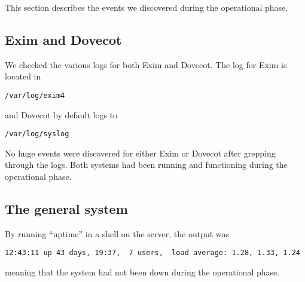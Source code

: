 This section describes the events we discovered during the operational
phase.
\subsection{Exim and Dovecot}
We checked the various logs for both Exim and Dovecot. The log for Exim
is located in \begin{verbatim}/var/log/exim4\end{verbatim} and Dovecot
by default logs to \begin{verbatim}/var/log/syslog\end{verbatim}

No huge events were discovered for either Exim or Dovecot after
grepping through the logs. Both systems had been running and functioning
during the operational phase.
\subsection{The general system}
By running ``uptime'' in a shell on the server, the output was
\begin{verbatim}12:43:11 up 43 days, 19:37,  7 users,  load average: 1.28, 1.33, 1.24\end{verbatim}
meaning that the system had not been down during the operational phase.
